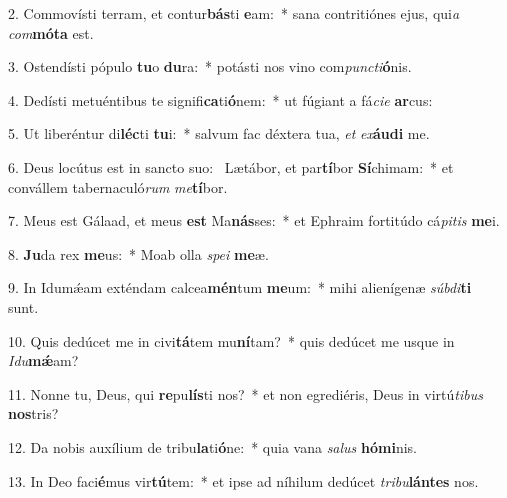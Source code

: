 2. Commovísti terram, et contur\textbf{bás}ti \textbf{e}am:~*  sana contritiónes ejus, qui\textit{a} \textit{com}\textbf{mó}\textbf{ta} est.\

3. Ostendísti pópulo \textbf{tu}o \textbf{du}ra:~*  potásti nos vino com\textit{punc}\textit{ti}\textbf{ó}nis.\

4. Dedísti metuéntibus te signifi\textbf{ca}ti\textbf{ó}nem:~*  ut fúgiant a fá\textit{ci}\textit{e} \textbf{ar}cus:\

5. Ut liberéntur di\textbf{léc}ti \textbf{tu}i:~*  salvum fac déxtera tua, \textit{et} \textit{ex}\textbf{áu}\textbf{di} me.\

6. Deus locútus est in sancto suo: \dag\  Lætábor, et par\textbf{tí}bor \textbf{Sí}chimam:~*  et convállem tabernaculó\textit{rum} \textit{me}\textbf{tí}bor.\

7. Meus est Gálaad, et meus \textbf{est} Ma\textbf{nás}ses:~*  et Ephraim fortitúdo cá\textit{pi}\textit{tis} \textbf{me}i.\

8. \textbf{Ju}da rex \textbf{me}us:~*  Moab olla \textit{spe}\textit{i} \textbf{me}æ.\

9. In Idumǽam exténdam calcea\textbf{mén}tum \textbf{me}um:~*  mihi alienígenæ \textit{súb}\textit{di}\textbf{ti} sunt.\

10. Quis dedúcet me in civi\textbf{tá}tem mu\textbf{ní}tam?~*  quis dedúcet me usque in \textit{I}\textit{du}\textbf{mǽ}am?\

11. Nonne tu, Deus, qui \textbf{re}pu\textbf{lís}ti nos?~*  et non egrediéris, Deus in virtú\textit{ti}\textit{bus} \textbf{nos}tris?\

12. Da nobis auxílium de tribu\textbf{la}ti\textbf{ó}ne:~*  quia vana \textit{sa}\textit{lus} \textbf{hó}\textbf{mi}nis.\

13. In Deo faci\textbf{é}mus vir\textbf{tú}tem:~*  et ipse ad níhilum dedúcet \textit{tri}\textit{bu}\textbf{lán}\textbf{tes} nos.\

